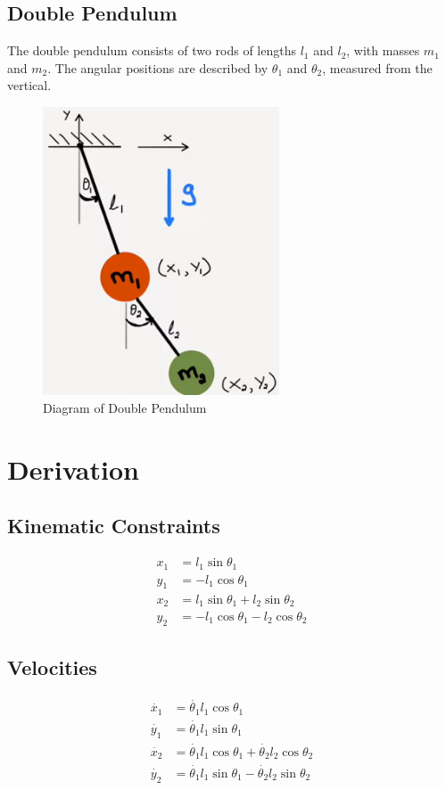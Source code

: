\documentclass[12pt]{article}
\begin{document}
\subsection{Double Pendulum}
\noindent
The double pendulum consists of two rods of lengths \(l_1\) and \(l_2\), with masses \(m_1\) and \(m_2\). The angular positions are described by \(\theta_1\) and \(\theta_2\), measured from the vertical.

\begin{figure}[H]
    \centering
    \includegraphics[width=70mm,height=\textheight,keepaspectratio]{images/double_pendulum.png}
    \caption{Diagram of Double Pendulum}
    \label{fig:double_pendulum}
\end{figure}

\section{Derivation}
\subsection{Kinematic Constraints}
\begin{align}
    x_1 &= l_1 \sin \theta_1 \\
    y_1 &= -l_1 \cos \theta_1 \\
    x_2 &= l_1 \sin \theta_1 + l_2 \sin \theta_2 \\
    y_2 &= -l_1 \cos \theta_1 - l_2 \cos \theta_2
\end{align}

\subsection{Velocities}
\begin{align}
    \dot{x_1} &= \dot{\theta_1} l_1 \cos \theta_1 \\
    \dot{y_1} &= \dot{\theta_1} l_1 \sin \theta_1 \\
    \dot{x_2} &= \dot{\theta_1} l_1 \cos \theta_1 + \dot{\theta_2} l_2 \cos \theta_2 \\
    \dot{y_2} &= \dot{\theta_1} l_1 \sin \theta_1 - \dot{\theta_2} l_2 \sin \theta_2
\end{align}
\end{document}

